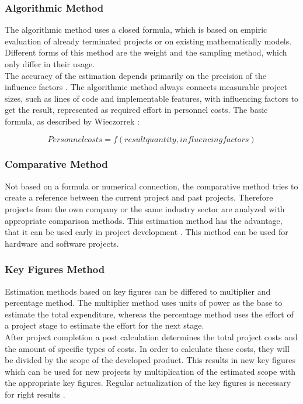 \subsubsection{Algorithmic Method}

The algorithmic method uses a closed formula, which is based on empiric evaluation of already terminated projects or on existing mathematically models. Different forms of this method are the weight and the sampling method, which only differ in their usage.\\
The accuracy of the estimation depends primarily on the precision of the influence factors \cite{itplanung}. The algorithmic method always connects measurable project sizes, such as lines of code and implementable features, with influencing factors to get the result, represented as required effort in personnel costs. The basic formula, as described by Wieczorrek \cite{itplanung}:

\begin{equation}
	Personnel costs = f(result quantity, influencing factors)
\end{equation}

\subsubsection{Comparative Method}

Not based on a formula or numerical connection, the comparative method tries to create a reference between the current project and past projects. Therefore projects from the own company or the same industry sector are analyzed with appropriate comparison methods. This estimation method has the advantage, that it can be used early in project development \cite{itplanung}. This method can be used for hardware and software projects.

\subsubsection{Key Figures Method}

Estimation methods based on key figures can be differed to multiplier and percentage  method. The multiplier method uses units of power as the base to estimate the total expenditure, whereas the percentage method uses the effort of a project stage to estimate the effort for the next stage.\\
After project completion a post calculation determines the total project costs and the amount of specific types of costs. In order to calculate these costs, they will be divided by the scope of the developed product. This results in new key figures which can be used for new projects by multiplication of the estimated scope with the appropriate key figures. Regular actualization of the key figures is necessary for right results \cite{itplanung}.\\

